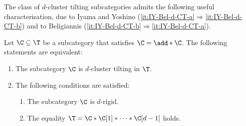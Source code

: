 \documentclass[a4paper]{amsart}
\begin{document}
The class of $d$-cluster tilting subcategories admits the following useful
characterisation, due to Iyama and Yoshino
(\eqref{it:IY-Bel-d-CT-a}$\Rightarrow$\eqref{it:IY-Bel-d-CT-b}) and to
Beligiannis (\eqref{it:IY-Bel-d-CT-b}$\Rightarrow$\eqref{it:IY-Bel-d-CT-a}).

\begin{theorem}
  \label{thm:IY-Bel-d-CT}
  Let $\C\subseteq\T$ be a subcategory that satisfies $\C=\add*{\C}$. The following
  statements are equivalent:
  \begin{enumerate}
  \item\label{it:IY-Bel-d-CT-a} The subcategory $\C$ is $d$-cluster tilting in
    $\T$.
  \item\label{it:IY-Bel-d-CT-b} The following conditions are satisfied:
    \begin{enumerate}
    \item The subcategory $\C$ is $d$-rigid.
    \item The equality $\T=\C*\C[1]*\cdots*\C[d-1]$ holds.
    \end{enumerate}
  \end{enumerate}
\end{theorem}
\end{document}

